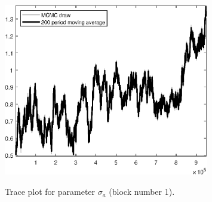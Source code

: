 \begin{figure}[H]
\centering
  \includegraphics[width=0.8\textwidth]{BRS_growth_util_sectoral/graphs/TracePlot_sigma_a_blck_1}\\
    \caption{Trace plot for parameter ${\sigma_a}$ (block number 1).}
\end{figure}

